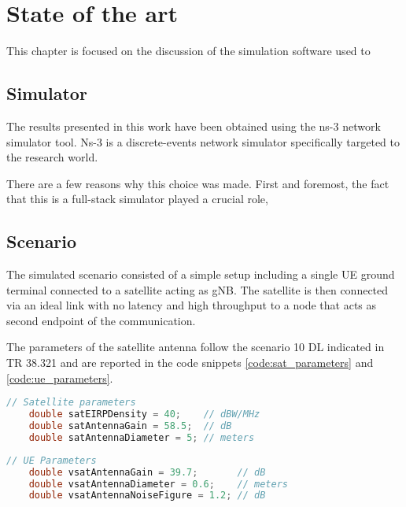 
\chapter{State of the art}
\label{chp:state_of_the_art}

This chapter is focused on the discussion of the simulation software used to 
\section{Simulator}
The results presented in this work have been obtained using the ns-3 network simulator tool. Ns-3 is a discrete-events network simulator specifically targeted to the research world.

There are a few reasons why this choice was made. First and foremost, the fact that this is a full-stack simulator played a crucial role, 

\section{Scenario}
The simulated scenario consisted of a simple setup including a single \ac{UE} ground terminal connected to a satellite acting as \ac{gNB}. The satellite is then connected via an ideal link with no latency and high throughput to a node that acts as second endpoint of the communication.

The parameters of the satellite antenna follow the scenario 10 DL indicated in TR 38.321  and are reported in the code snippets \ref{code:sat_parameters} and \ref{code:ue_parameters}.

\begin{lstlisting}[language=C++, caption=Satellite antenna parameters, label=code:sat_parameters]
    // Satellite parameters
    double satEIRPDensity = 40;    // dBW/MHz
    double satAntennaGain = 58.5;  // dB
    double satAntennaDiameter = 5; // meters
\end{lstlisting}

\begin{lstlisting}[language=C++, caption=UE antenna parameters, label=code:ue_parameters]
    // UE Parameters
    double vsatAntennaGain = 39.7;       // dB
    double vsatAntennaDiameter = 0.6;    // meters
    double vsatAntennaNoiseFigure = 1.2; // dB 
\end{lstlisting}


